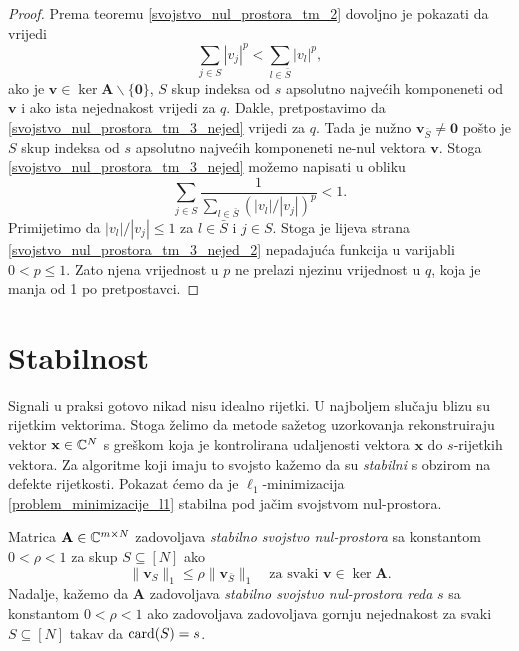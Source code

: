 \documentclass[a4paper,twoside,12pt]{memoir} %
\newcommand{\vect}[1]{\mathbf{#1}}
\renewcommand{\vec}{\vect}
\newcommand{\card}{\text{\normalfont{card}}}
\newcommand{\norm}[1]{\|{#1}\|}
\begin{document}
\begin{proof}
    Prema teoremu \ref{svojstvo_nul_prostora_tm_2} dovoljno je pokazati da vrijedi
    \begin{equation}\label{svojstvo_nul_prostora_tm_3_nejed}
        \sum_{j \in S} |v_j|^p < \sum_{l \in \bar S}|v_l|^p,
    \end{equation}
    ako je $\vec v \in \ker \vec A \backslash \{\vec 0\}$, $S$ skup indeksa od $s$ apsolutno najve\'cih komponeneti od $\vec v$ i ako ista nejednakost vrijedi za $q$.
    Dakle, pretpostavimo da \eqref{svojstvo_nul_prostora_tm_3_nejed} vrijedi za $q$. Tada je nu\v{z}no $\vec v_{\bar S} \neq \vec 0$ po\v{s}to je $S$ skup indeksa od $s$ apsolutno najve\'cih komponeneti ne-nul vektora $\vec v$. Stoga \eqref{svojstvo_nul_prostora_tm_3_nejed} mo\v{z}emo napisati u obliku
    \begin{equation}\label{svojstvo_nul_prostora_tm_3_nejed_2}
        \sum_{j \in S} \frac{1}{\sum_{l \in \bar S}(|v_l|/|v_j|)^p} < 1.  
    \end{equation}
    Primijetimo da $|v_l|/|v_j| \leq 1$ za $l \in \bar S$ i $j \in S$. Stoga je lijeva strana \eqref{svojstvo_nul_prostora_tm_3_nejed_2} nepadaju\'ca funkcija u varijabli $0<p \leq 1$. Zato njena vrijednost u $p$ ne prelazi njezinu vrijednost u $q$, koja je manja od 1 po pretpostavci.
\end{proof}

\section[Stabilnost][Stabilnost]{Stabilnost}
Signali u praksi gotovo nikad nisu idealno rijetki. U najboljem slu\v{c}aju blizu su rijetkim vektorima. Stoga \v{z}elimo da metode sa\v{z}etog uzorkovanja rekonstruiraju vektor $\vec x \in \C^N$ s gre\v{s}kom koja je kontrolirana udaljenosti vektora $\vec x$ do $s$-rijetkih vektora. Za algoritme koji imaju to svojsto ka\v{z}emo da su \textit{stabilni} s obzirom na defekte rijetkosti. Pokazat \'cemo da je $\ell_1$-minimizacija \eqref{problem_minimizacije_l1} stabilna pod ja\v{c}im svojstvom nul-prostora.

\begin{defn}
    Matrica $\vec A \in \C^{m \times N}$ zadovoljava \textit{stabilno svojstvo nul-prostora} sa konstantom $0<\rho<1$ za skup $S \subseteq [N]$ ako
    \begin{equation*}
        \norm{\vec v_S}_1 \leq \rho \norm{\vec v_{\bar S}}_1 \quad \text{za svaki }\vec v \in \ker \vec A.
    \end{equation*}
    Nadalje, ka\v{z}emo da $\vec A$ zadovoljava \textit{stabilno svojstvo nul-prostora reda} $s$ sa konstantom $0<\rho<1$ ako zadovoljava zadovoljava gornju nejednakost za svaki $S \subseteq [N]$ takav da $\card(S)=s$.
\end{defn}
\end{document}
